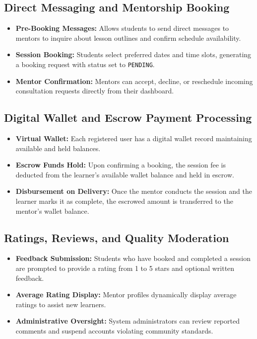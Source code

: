 \documentclass[12pt,a4paper]{report}
\begin{document}
\subsection{Direct Messaging and Mentorship Booking}
\begin{itemize}[leftmargin=1.5em, itemsep=2pt]
  \item \textbf{Pre-Booking Messages:} Allows students to send direct messages to mentors to inquire about lesson outlines and confirm schedule availability.
  \item \textbf{Session Booking:} Students select preferred dates and time slots, generating a booking request with status set to \texttt{PENDING}.
  \item \textbf{Mentor Confirmation:} Mentors can accept, decline, or reschedule incoming consultation requests directly from their dashboard.
\end{itemize}

\subsection{Digital Wallet and Escrow Payment Processing}
\begin{itemize}[leftmargin=1.5em, itemsep=2pt]
  \item \textbf{Virtual Wallet:} Each registered user has a digital wallet record maintaining available and held balances.
  \item \textbf{Escrow Funds Hold:} Upon confirming a booking, the session fee is deducted from the learner's available wallet balance and held in escrow.
  \item \textbf{Disbursement on Delivery:} Once the mentor conducts the session and the learner marks it as complete, the escrowed amount is transferred to the mentor's wallet balance.
\end{itemize}

\subsection{Ratings, Reviews, and Quality Moderation}
\begin{itemize}[leftmargin=1.5em, itemsep=2pt]
  \item \textbf{Feedback Submission:} Students who have booked and completed a session are prompted to provide a rating from 1 to 5 stars and optional written feedback.
  \item \textbf{Average Rating Display:} Mentor profiles dynamically display average ratings to assist new learners.
  \item \textbf{Administrative Oversight:} System administrators can review reported comments and suspend accounts violating community standards.
\end{itemize}
\end{document}
